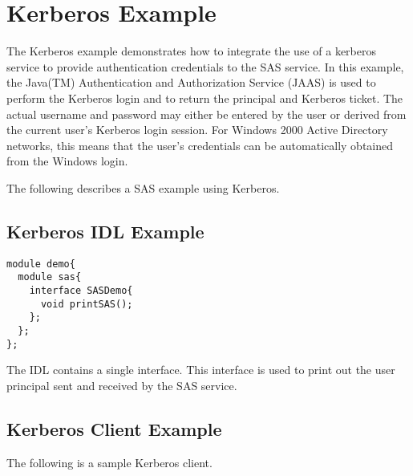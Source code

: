 \section{Kerberos Example}

The Kerberos example demonstrates how to integrate the use of a kerberos
service to provide authentication credentials to the SAS service. 
In this example, the Java(TM) Authentication and Authorization Service (JAAS)
is used to perform the Kerberos login
and to return the principal and Kerberos ticket.
The actual username and password may either be entered by the user
or derived from the current user's Kerberos login session.
For Windows 2000 Active Directory networks, this means that the user's
credentials can be automatically obtained from the Windows login.

The following describes a SAS example using Kerberos.

\subsection{Kerberos IDL Example}

\begin{scriptsize}
\begin{verbatim}
module demo{
  module sas{
    interface SASDemo{
      void printSAS();
    };
  };
};
\end{verbatim}
\end{scriptsize}

The IDL contains a single interface. This interface is used to print out
the user principal sent and received by the SAS service.

\subsection{Kerberos Client Example}

The following is a sample Kerberos client.

